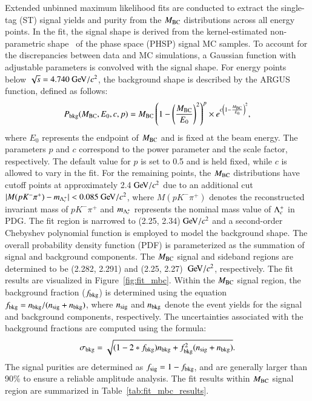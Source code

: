 Extended unbinned maximum likelihood fits are conducted to extract the single-tag (ST) signal yields and purity from the $M_{\rm{BC}}$ distributions across all energy points. In the fit, the signal shape is derived from the kernel-estimated non-parametric shape~\cite{Cranmer:2000du} of the phase space (PHSP) signal MC samples. To account for the discrepancies between data and MC simulations, a Gaussian function with adjustable parameters is convolved with the signal shape. For energy points below $\sqrt{s} = 4.740\gev/c^2$, the background shape is described by the ARGUS~\cite{Djouadi:1989hh} function, defined as follows:
\begin{equation}
P_{\rm bkg}(M_{\rm{BC}},E_0,c,p) = M_{\rm{BC}} \left(1 - \left(\frac{M_{\rm{BC}}}{E_0}\right)^2 \right)^p \times e^{c \left(1-\frac{M_{\rm{BC}}}{E_0}\right)^2},
\end{equation}
where $E_0$ represents the endpoint of $M_{\rm{BC}}$ and is fixed at the beam energy. The parameters $p$ and $c$ correspond to the power parameter and the scale factor, respectively. The default value for $p$ is set to 0.5 and is held fixed, while $c$ is allowed to vary in the fit. For the remaining points, the $M_{\rm{BC}}$ distributions have cutoff points at approximately 2.4$\gev/c^2$ due to %
an additional cut $|M(pK^-\pi^+) - m_{\lcp}| < 0.085\gev/c^2$, where $M(pK^-\pi^+)$ denotes the reconstructed invariant mass of $pK^-\pi^+$ and $m_{\Lambda_{c}^{+}}$ represents the nominal mass value of $\Lambda_{c}^{+}$ in PDG.
The fit region is narrowed to (2.25, 2.34)$\gev/c^2$ and a second-order Chebyshev polynomial function is employed to model the background shape. The overall probability density function (PDF) is parameterized as the summation of signal and background components. The $M_{\rm{BC}}$ signal and sideband regions are determined to be (2.282, 2.291) and (2.25, 2.27) $\gev/c^2$, respectively. The fit results are visualized in Figure~\ref{fig:fit_mbc}. Within the $M_{\rm{BC}}$ signal region, the background fraction ($f_{\rm bkg}$) is determined using the equation $f_{\rm bkg} = n_{\rm bkg}/(n_{\rm sig} + n_{\rm bkg})$, where $n_{\rm sig}$ and $n_{\rm bkg}$ denote the event yields for the signal and background components, respectively. 
The uncertainties associated with the background fractions are computed using the formula:
\begin{equation}
    \sigma_{\rm bkg} = \sqrt{(1-2*f_{\rm bkg})n_{\rm bkg} + f_{\rm bkg}^2(n_{\rm sig} + n_{\rm bkg})}.
\end{equation}
The signal purities are determined as $f_{\rm sig} = 1 - f_{\rm bkg}$, and are generally larger than 90\% to ensure a reliable amplitude analysis.
The fit results within $M_{\rm{BC}}$ signal region are summarized in Table~\ref{tab:fit_mbc_results}.

